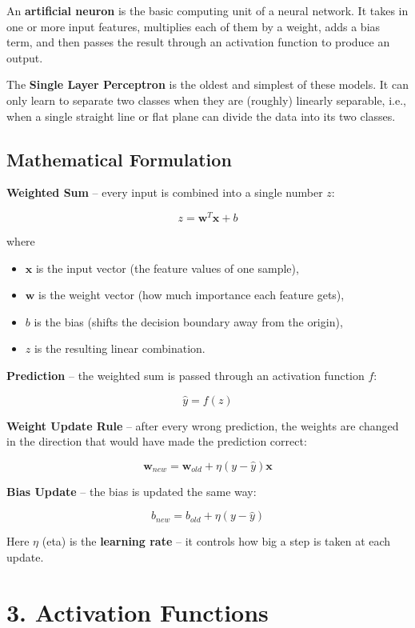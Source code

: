 \documentclass[11pt]{article}
\begin{document}
An \textbf{artificial neuron} is the basic computing unit of a neural network. It takes in one or more input features, multiplies each of them by a weight, adds a bias term, and then passes the result through an activation function to produce an output.

The \textbf{Single Layer Perceptron} is the oldest and simplest of these models. It can only learn to separate two classes when they are (roughly) linearly separable, i.e., when a single straight line or flat plane can divide the data into its two classes.

\subsection*{Mathematical Formulation}

\textbf{Weighted Sum} -- every input is combined into a single number $z$:

\[
z=\mathbf{w}^{T}\mathbf{x}+b
\]

where

\begin{itemize}
\item $\mathbf{x}$ is the input vector (the feature values of one sample),
\item $\mathbf{w}$ is the weight vector (how much importance each feature gets),
\item $b$ is the bias (shifts the decision boundary away from the origin),
\item $z$ is the resulting linear combination.
\end{itemize}

\textbf{Prediction} -- the weighted sum is passed through an activation function $f$:

\[
\hat y=f(z)
\]

\textbf{Weight Update Rule} -- after every wrong prediction, the weights are changed in the direction that would have made the prediction correct:

\[
\mathbf{w}_{new}
=
\mathbf{w}_{old}
+
\eta
(y-\hat y)
\mathbf{x}
\]

\textbf{Bias Update} -- the bias is updated the same way:

\[
b_{new}
=
b_{old}
+
\eta
(y-\hat y)
\]

Here $\eta$ (eta) is the \textbf{learning rate} -- it controls how big a step is taken at each update.


\section*{3. Activation Functions}
\end{document}
